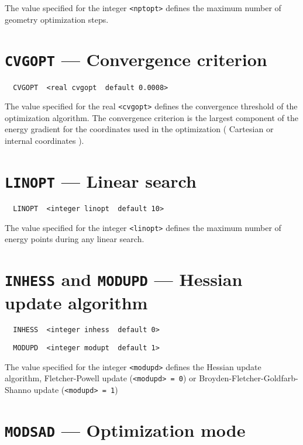 The value specified for the integer \verb+<nptopt>+ defines the maximum 
number of geometry optimization steps.  

\section{{\tt CVGOPT} --- Convergence criterion}

\begin{verbatim}
  CVGOPT  <real cvgopt  default 0.0008>
\end{verbatim}
 
The value specified for the real \verb+<cvgopt>+ defines the convergence
threshold of the optimization algorithm. The convergence criterion is
the largest component of the energy gradient for the coordinates used
in the optimization ( Cartesian or internal coordinates ).

\section{{\tt LINOPT} --- Linear search}

\begin{verbatim}
  LINOPT  <integer linopt  default 10>
\end{verbatim}

The value specified for the integer \verb+<linopt>+ defines the maximum 
number of energy points during any linear search. 

\section{{\tt INHESS} and {\tt MODUPD} --- Hessian update algorithm}

\begin{verbatim}
  INHESS  <integer inhess  default 0>
\end{verbatim}

\begin{verbatim}
  MODUPD  <integer modupt  default 1>
\end{verbatim}

\sloppy

The value specified for the integer \verb+<modupd>+ defines the
Hessian update algorithm, Fle\-tcher-Powell update (\verb+<modupd> = 0+)
or Broy\-den-Fle\-tcher-Gold\-farb-Shanno update (\verb+<modupd> = 1+)

\section{{\tt MODSAD} --- Optimization mode}

